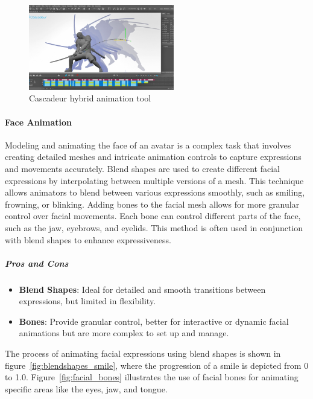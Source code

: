 \documentclass[../../main.tex]{subfiles}
\begin{document}
\begin{figure} 
  \centering \includegraphics[width = 2.5in]{chapters/background_work/images/cascadeur.png} 
  \caption{Cascadeur hybrid animation tool} 
  \label{fig:cascadeur} 
\end{figure}

\paragraph{Face Animation}
\label{ch:background_work:sign_language_synthesis:3d_techniques:mesh_and_texture:face_animation}

Modeling and animating the face of an avatar is a complex task that involves creating detailed meshes and intricate animation controls to capture expressions and movements accurately. Blend shapes are used to create different facial expressions by interpolating between multiple versions of a mesh. This technique allows animators to blend between various expressions smoothly, such as smiling, frowning, or blinking. Adding bones to the facial mesh allows for more granular control over facial movements. Each bone can control different parts of the face, such as the jaw, eyebrows, and eyelids. This method is often used in conjunction with blend shapes to enhance expressiveness.

\subparagraph{Pros and Cons}
\begin{itemize}
  \item \textbf{Blend Shapes}: Ideal for detailed and smooth transitions between expressions, but limited in flexibility.
  \item \textbf{Bones}: Provide granular control, better for interactive or dynamic facial animations but are more complex to set up and manage.
\end{itemize}

The process of animating facial expressions using blend shapes is shown in figure~\ref{fig:blendshapes_smile}, where the progression of a smile is depicted from 0 to 1.0. Figure~\ref{fig:facial_bones} illustrates the use of facial bones for animating specific areas like the eyes, jaw, and tongue.
\end{document}
